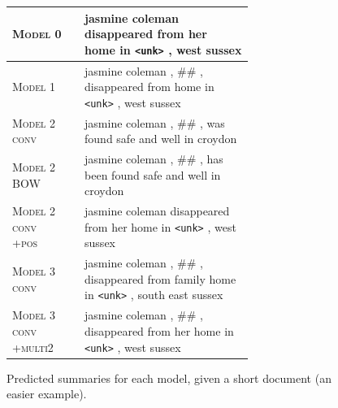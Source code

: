 \documentclass[12pt]{report}
\begin{document}
\begin{figure}[p]
\begin{tabular}{ll p{0.7\linewidth}}
\textsc{Model 0} & & jasmine coleman disappeared from her home in \texttt{<unk>} , west sussex \\
\midrule
 \textsc{Model 1} & & jasmine coleman , \#\# , disappeared from home in \texttt{<unk>} , west sussex \\
\midrule
\textsc{Model 2 conv} & & jasmine coleman , \#\# , was found safe and well in croydon \\
\textsc{Model 2 BOW} & & jasmine coleman , \#\# , has been found safe and well in croydon \\
\textsc{Model 2 conv +pos} & & jasmine coleman disappeared from her home in \texttt{<unk>} , west sussex \\
\midrule
\textsc{Model 3 conv} & & jasmine coleman , \#\# , disappeared from family home in \texttt{<unk>} , south east sussex \\
\textsc{Model 3 conv +multi2} & & jasmine coleman , \#\# , disappeared from her home in \texttt{<unk>} , west sussex \\
\bottomrule
\end{tabular}
\caption{Predicted summaries for each model, given a short document (an easier example).}
\label{fig:predicted_summaries}
\end{figure}
\end{document}
